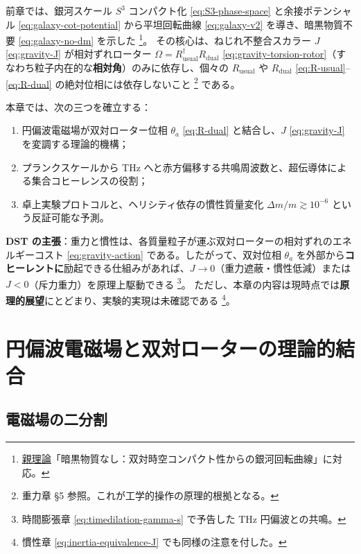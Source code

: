 \documentclass[dvipdfmx,a4paper,oneside]{jsbook}
\numberwithin{equation}{chapter}
\begin{document}
前章では、銀河スケール \(S^3\) コンパクト化 \eqref{eq:S3-phase-space} と余接ポテンシャル \eqref{eq:galaxy-cot-potential} から平坦回転曲線 \eqref{eq:galaxy-v2} を導き、暗黒物質不要 \eqref{eq:galaxy-no-dm} を示した \footnote{\hyperref[sec:sister-manuscripts]{親理論}「暗黒物質なし：双対時空コンパクト性からの銀河回転曲線」に対応。}。
その核心は、ねじれ不整合スカラー \(J\) \eqref{eq:gravity-J} が相対ずれローター \(\Omega = R_{\mathrm{usual}}^\dagger R_{\mathrm{dual}}\) \eqref{eq:gravity-torsion-rotor}（すなわち粒子内在的な\textbf{相対角}）のみに依存し、個々の \(R_{\mathrm{usual}}\) や \(R_{\mathrm{dual}}\) \eqref{eq:R-usual}–\eqref{eq:R-dual} の絶対位相には依存しないこと \footnote{重力章 §5 参照。これが工学的操作の原理的根拠となる。} である。

本章では、次の三つを確立する：
\begin{enumerate}[leftmargin=2em]
  \item 円偏波電磁場が双対ローター位相 \(\theta_a\) \eqref{eq:R-dual} と結合し、\(J\) \eqref{eq:gravity-J} を変調する理論的機構；
  \item プランクスケールから THz へと赤方偏移する共鳴周波数と、超伝導体による集合コヒーレンスの役割；
  \item 卓上実験プロトコルと、ヘリシティ依存の慣性質量変化 \(\Delta m/m \gtrsim 10^{-6}\) という反証可能な予測。
\end{enumerate}

\textbf{DST の主張}：重力と慣性は、各質量粒子が運ぶ双対ローターの相対ずれのエネルギーコスト \eqref{eq:gravity-action} である。したがって、双対位相 \(\theta_a\) を外部から\textbf{コヒーレントに}励起できる仕組みがあれば、\(J \to 0\)（重力遮蔽・慣性低減）または \(J < 0\)（斥力重力）を原理上駆動できる \footnote{時間膨張章 \eqref{eq:timedilation-gamma-s} で予告した THz 円偏波との共鳴。}。
ただし、本章の内容は現時点では\textbf{原理的展望}にとどまり、実験的実現は未確認である \footnote{慣性章 \eqref{eq:inertia-equivalence-J} でも同様の注意を付した。}。

\section{円偏波電磁場と双対ローターの理論的結合}

\subsection{電磁場の二分割}
\end{document}
